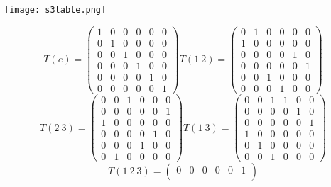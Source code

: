 \documentclass{amsart}
\begin{document}
{
\center
\texttt{[image: s3table.png]}

\begin{equation*}
    T (e) = \begin{pmatrix}
        1 & 0 & 0 & 0 & 0 & 0\\ 
        0 & 1 & 0 & 0 & 0 & 0\\
        0 & 0 & 1 & 0 & 0 & 0\\
        0 & 0 & 0 & 1 & 0 & 0\\
        0 & 0 & 0 & 0 & 1 & 0\\
        0 & 0 & 0 & 0 & 0 & 1
    \end{pmatrix}
    T (1\ 2) = \begin{pmatrix}
        0 & 1 & 0 & 0 & 0 & 0\\ 
        1 & 0 & 0 & 0 & 0 & 0\\
        0 & 0 & 0 & 0 & 1 & 0\\
        0 & 0 & 0 & 0 & 0 & 1\\
        0 & 0 & 1 & 0 & 0 & 0\\
        0 & 0 & 0 & 1 & 0 & 0
    \end{pmatrix}
\end{equation*}
\begin{equation*}
    T (2\ 3) = \begin{pmatrix}
        0 & 0 & 1 & 0 & 0 & 0\\ 
        0 & 0 & 0 & 0 & 0 & 1\\
        1 & 0 & 0 & 0 & 0 & 0\\
        0 & 0 & 0 & 0 & 1 & 0\\
        0 & 0 & 0 & 1 & 0 & 0\\
        0 & 1 & 0 & 0 & 0 & 0
    \end{pmatrix}
    T (1\ 3) = \begin{pmatrix}
        0 & 0 & 1 & 1 & 0 & 0\\ 
        0 & 0 & 0 & 0 & 1 & 0\\
        0 & 0 & 0 & 0 & 0 & 1\\
        1 & 0 & 0 & 0 & 0 & 0\\
        0 & 1 & 0 & 0 & 0 & 0\\
        0 & 0 & 1 & 0 & 0 & 0
    \end{pmatrix}
\end{equation*}
\begin{equation*}
    T (1\ 2\ 3) = \begin{pmatrix}
        0 & 0 & 0 & 0 & 0 & 1\\ 

\end{pmatrix}
\end{equation*}}
\end{document}

